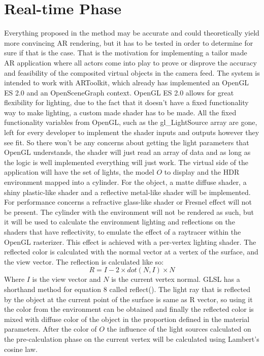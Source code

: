 \section{Real-time Phase}
Everything proposed in the method may be accurate and could theoretically yield more convincing AR rendering, but it has to be tested in order to determine for sure if that is the case. That is the motivation for implementing a tailor made AR application where all actors come into play to prove or disprove the accuracy and feasibility of the composited virtual objects in the camera feed.\newline
The system is intended to work with ARToolkit, which already has implemented an OpenGL ES 2.0 and an OpenSceneGraph context. OpenGL ES 2.0 allows for great flexibility for lighting, due to the fact that it doesn't have a fixed functionality way to make lighting, a custom made shader has to be made. All the fixed functionality variables from OpenGL, such as the gl\_LightSource array are gone, left for every developer to implement the shader inputs and outputs however they see fit. So there won't be any concerns about getting the light parameters that OpenGL understands, the shader will just read an array of data and as long as the logic is well implemented everything will just work.\newline
The virtual side of the application will have the set of lights, the model $O$ to display and the HDR environment mapped into a cylinder. For the object, a matte diffuse shader, a shiny plastic-like shader and a reflective metal-like shader will be implemented. For performance concerns a refractive glass-like shader or Fresnel effect will not be present. The cylinder with the environment will not be rendered as such, but it will be used to calculate the environment lighting and reflections on the shaders that have reflectivity, to emulate the effect of a raytracer within the OpenGL rasterizer. This effect is achieved with a per-vertex lighting shader.  The reflected color is calculated with the normal vector at a vertex of the surface, and the view vector. The reflection is calculated like so:
\begin{equation}
    R = I - 2\times dot(N,I) \times N
\end{equation}
Where $I$ is the view vector and $N$ is the current vertex normal. GLSL has a shorthand method for equation 8 called reflect().
The light ray that is reflected by the object at the current point of the surface is same as R vector, so using it the color from the environment can be obtained and finally the reflected color is mixed with diffuse color of the object in the proportion defined in the material parameters. \newline
After the color of $O$ the influence of the light sources calculated on the pre-calculation phase on the current vertex will be calculated using Lambert's cosine law.